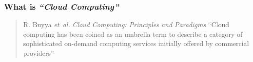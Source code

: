 \begin{frame}
  \frametitle{ What is \textit{``Cloud Computing''}}

  \begin{quote}{R. Buyya \emph{et~al.} \textit{Cloud Computing: Principles and Paradigms}}
    ``Cloud computing has been coined as an umbrella term to describe a category of
    sophisticated \alert{on-demand} computing services initially offered by commercial providers''
  \end{quote}

\end{frame}

